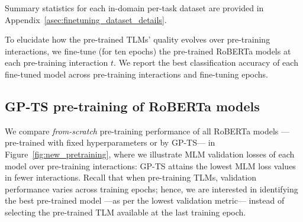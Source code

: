 Summary statistics for each in-domain per-task dataset
are provided in Appendix~\ref{asec:finetuning_dataset_details}.

To elucidate how the pre-trained TLMs' quality evolves over pre-training interactions,
we fine-tune (for ten epochs) the pre-trained RoBERTa models at each pre-training interaction $t$.
We report the best classification accuracy of each fine-tuned model across pre-training interactions and fine-tuning epochs.

\subsection{GP-TS pre-training of RoBERTa models}
\label{ssec:pretraining}

We compare \textit{from-scratch} pre-training performance of all RoBERTa models
---pre-trained with fixed hyperparameters or by GP-TS--- in Figure~\ref{fig:new_pretraining},
where we illustrate MLM validation losses of each model over pre-training interactions:
GP-TS attains the lowest MLM loss values in fewer interactions.
%
Recall that when pre-training TLMs, validation performance varies across training epochs;
hence, we are interested in identifying the best pre-trained model
---as per the lowest validation metric---
instead of selecting the pre-trained TLM available at the last training epoch.

